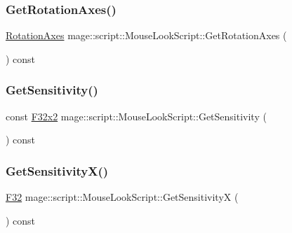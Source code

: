 \subsubsection{\texorpdfstring{Get\+Rotation\+Axes()}{GetRotationAxes()}}
{\footnotesize\ttfamily \hyperlink{classmage_1_1script_1_1_mouse_look_script_a662018db64c5dc84a958eb1c6123a829}{Rotation\+Axes} mage\+::script\+::\+Mouse\+Look\+Script\+::\+Get\+Rotation\+Axes (\begin{DoxyParamCaption}{ }\end{DoxyParamCaption}) const\hspace{0.3cm}{\ttfamily [noexcept]}}

\hypertarget{classmage_1_1script_1_1_mouse_look_script_aba0ebcfb2085d74ee7d6b388d4b0b239}{}\label{classmage_1_1script_1_1_mouse_look_script_aba0ebcfb2085d74ee7d6b388d4b0b239} 
\subsubsection{\texorpdfstring{Get\+Sensitivity()}{GetSensitivity()}}
{\footnotesize\ttfamily const \hyperlink{namespacemage_aa87237ad091f5cd7da612b8523fc108f}{F32x2} mage\+::script\+::\+Mouse\+Look\+Script\+::\+Get\+Sensitivity (\begin{DoxyParamCaption}{ }\end{DoxyParamCaption}) const\hspace{0.3cm}{\ttfamily [noexcept]}}

\hypertarget{classmage_1_1script_1_1_mouse_look_script_a86ee9593f0221bfa259f5ae5dd6edb30}{}\label{classmage_1_1script_1_1_mouse_look_script_a86ee9593f0221bfa259f5ae5dd6edb30} 
\subsubsection{\texorpdfstring{Get\+Sensitivity\+X()}{GetSensitivityX()}}
{\footnotesize\ttfamily \hyperlink{namespacemage_aa97e833b45f06d60a0a9c4fc22ae02c0}{F32} mage\+::script\+::\+Mouse\+Look\+Script\+::\+Get\+SensitivityX (\begin{DoxyParamCaption}{ }\end{DoxyParamCaption}) const\hspace{0.3cm}{\ttfamily [noexcept]}}

